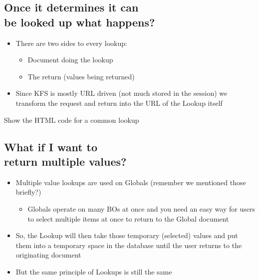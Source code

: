 \begin{ifhtml}
\begin{s5slide}
        \section{Once it determines it can\\ be looked up what happens?}
            \begin{itemize}
                \item There are two sides to every lookup:
                \begin{itemize}
                    \item Document doing the lookup
                    \item The return (values being returned)
                \end{itemize}
                \item Since KFS is mostly URL driven (not much stored in the session) we transform the request and return into the URL of the Lookup itself
            \end{itemize}
            \begin{s5notes}
                Show the HTML code for a common lookup
            \end{s5notes}
    \end{s5slide}
    \begin{s5slide}
        \section{What if I want to\\ return multiple values?}
            \begin{itemize}
                \item Multiple value lookups are used on Globals (remember we mentioned those briefly?)
                \begin{itemize}
                    \item Globals operate on many BOs at once and you need an easy way for users to select multiple items at once to return to the Global document
                \end{itemize}
                \item So, the Lookup will then take those temporary (selected) values and put them into a temporary space in the database until the user returns to the originating document
                \item But the same principle of Lookups is still the same
            \end{itemize}
    \end{s5slide}
    \begin{s5slide}

\end{s5slide}
\end{ifhtml}

